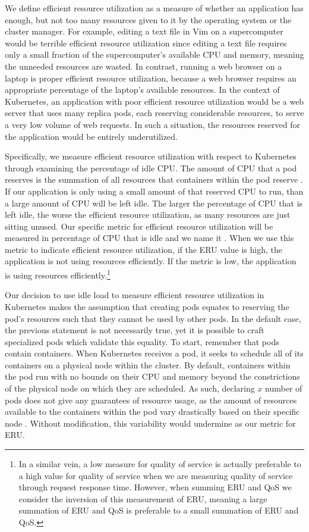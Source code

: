 We define efficient resource utilization as a measure of whether an application
has enough, but not too many resources given to it by the operating system or
the cluster manager. For example, editing a text file in Vim on a supercomputer
would be terrible efficient resource utilization since editing a text file
requires only a small fraction of the supercomputer's available CPU and memory,
meaning the unneeded resources are wasted. In contrast, running a web browser on
a laptop is proper efficient resource utilization, because a web browser requires
an appropriate percentage of the laptop's available resources.
In the context of Kubernetes, an application with
poor efficient resource utilization would be a web server
that uses many replica pods, each reserving considerable resources,
to serve a very low volume of web requests. In such a situation, the resources
reserved for the application would be entirely underutilized.

Specifically, we measure efficient resource utilization with respect to
Kubernetes through examining the percentage of idle CPU.
The amount of CPU that a pod reserves is the summation of
all resources that containers within the pod reserve
\cite{k8s-compute-resources}. If our application is only using a small amount of
that reserved CPU to run, than a large amount of CPU will be left idle. The
larger the percentage of CPU that is left idle, the worse the efficient resource
utilization, as many resources are just sitting unused.
Our specific metric for efficient resource
utilization will be measured in percentage of CPU that is idle and we name it
. When we use this metric to indicate efficient resource utilization,
if the ERU value is high, the application is not using resources efficiently. If
the metric is low, the application is using resources efficiently.\footnote{In a
similar vein, a low measure for quality of service is actually preferable to a
high value for quality of service when we are measuring quality of service
through request response time. However, when summing ERU and QoS we consider
the inversion of this measurement of ERU, meaning a large summation of ERU and
QoS is preferable to a small summation of ERU and QoS.}

Our decision to use idle load to measure efficient resource utilization
in Kubernetes makes the assumption that
creating pods equates to reserving the pod's resources such
that they cannot be used by other pods.
In the default case, the previous statement is not necessarily true,
yet it is possible to craft specialized pods which validate this equality. To
start, remember that pods contain containers. When Kubernetes receives a pod, it
seeks to schedule all of its containers on a physical node within the cluster.
By default, containers within the pod run with no bounds on their CPU and memory
beyond the constrictions of the physical node on which they are scheduled. As such,
declaring $x$ number of pods does not give any guarantees of resource usage, as
the amount of resources available to the containers within the pod vary
drastically based on their specific node \cite{k8s-limit-range}. Without
modification, this variability would undermine  as our metric for
ERU.


